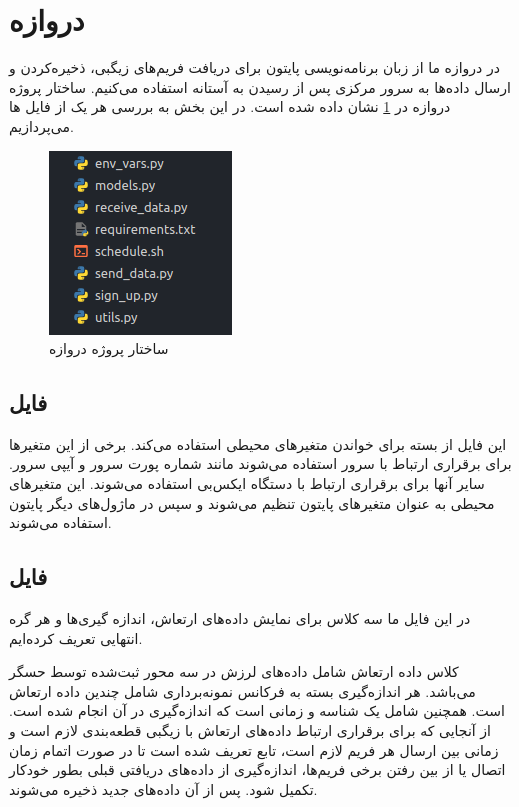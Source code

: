 \section{دروازه}

در دروازه ما از زبان برنامه‌نویسی پایتون برای دریافت فریم‌های زیگبی، ذخیره‌کردن و ارسال داده‌ها به سرور مرکزی پس از رسیدن به آستانه استفاده می‌کنیم. ساختار پروژه دروازه در \cref{fig:gateway_structure} نشان داده شده است. در این بخش به بررسی هر یک از فایل ها می‌پردازیم.


\begin{figure}[!h]
\centering\includegraphics[scale=1]{gateway_structure.png}
\caption{ساختار پروژه دروازه}\label{fig:gateway_structure}
\end{figure}

\subsection{فایل }

این فایل از بسته  برای خواندن متغیرهای محیطی استفاده می‌کند. برخی از این متغیرها برای برقراری ارتباط با سرور استفاده می‌شوند مانند شماره پورت سرور و آیپی سرور. سایر آنها برای برقراری ارتباط با دستگاه ایکس‌بی استفاده می‌شوند. این متغیرهای محیطی به عنوان متغیرهای پایتون تنظیم می‌شوند و سپس در ماژول‌های دیگر پایتون استفاده می‌شوند.

\subsection{فایل }

در این فایل ما سه کلاس برای نمایش داده‌های ارتعاش، اندازه گیری‌ها و هر گره انتهایی تعریف کرده‌ایم.

کلاس داده ارتعاش شامل داده‌های لرزش در سه محور ثبت‌شده توسط حسگر می‌باشد. هر اندازه‌گیری بسته به فرکانس نمونه‌برداری شامل چندین داده ارتعاش است. همچنین شامل یک شناسه و زمانی است که اندازه‌گیری در آن انجام شده است. از آنجایی که برای برقراری ارتباط داده‌های ارتعاش با زیگبی قطعه‌بندی لازم است و زمانی بین ارسال هر فریم لازم است، تابع  تعریف شده است تا در صورت اتمام زمان اتصال یا از بین رفتن برخی فریم‌ها، اندازه‌گیری از داده‌های دریافتی قبلی بطور خودکار تکمیل شود. پس از آن داده‌های جدید ذخیره می‌شوند.

